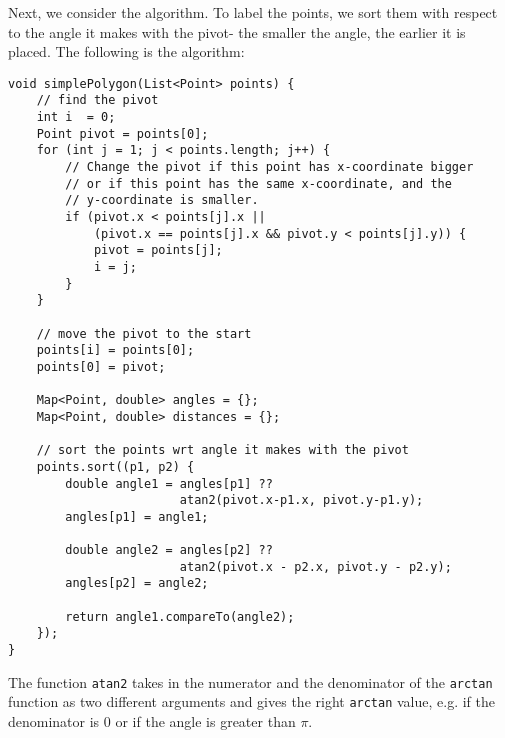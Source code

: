 \documentclass[a4paper, openany]{memoir}
\begin{document}
Next, we consider the algorithm. To label the points, we sort them with respect to the angle it makes with the pivot- the smaller the angle, the earlier it is placed. The following is the algorithm:
\begin{lstlisting}[language=pseudocode]
void simplePolygon(List<Point> points) {
    // find the pivot
    int i  = 0;
    Point pivot = points[0];
    for (int j = 1; j < points.length; j++) {
        // Change the pivot if this point has x-coordinate bigger 
        // or if this point has the same x-coordinate, and the 
        // y-coordinate is smaller.
        if (pivot.x < points[j].x || 
            (pivot.x == points[j].x && pivot.y < points[j].y)) {
            pivot = points[j];
            i = j;
        }
    }
    
    // move the pivot to the start
    points[i] = points[0];
    points[0] = pivot;
    
    Map<Point, double> angles = {};
    Map<Point, double> distances = {};
    
    // sort the points wrt angle it makes with the pivot
    points.sort((p1, p2) {
        double angle1 = angles[p1] ?? 
                        atan2(pivot.x-p1.x, pivot.y-p1.y);
        angles[p1] = angle1;
    
        double angle2 = angles[p2] ?? 
                        atan2(pivot.x - p2.x, pivot.y - p2.y);
        angles[p2] = angle2;
    
        return angle1.compareTo(angle2);
    });
}
\end{lstlisting}
The function \texttt{atan2} takes in the numerator and the denominator of the \texttt{arctan} function as two different arguments and gives the right \texttt{arctan} value, e.g. if the denominator is 0 or if the angle is greater than $\pi$.
\end{document}
